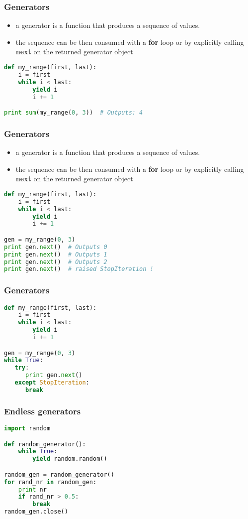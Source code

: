 \documentclass{beamer}
\begin{document}
\begin{frame}[fragile]
\frametitle{Generators}
\begin{itemize}
  \item a generator is a function that produces a sequence of values.
  \item the sequence can be then consumed with a {\bf for} loop or by explicitly
    calling {\bf next} on the returned generator object
\end{itemize}
\vspace{5 mm}
\begin{lstlisting}[language=python]
def my_range(first, last):
    i = first
    while i < last:
        yield i
        i += 1

print sum(my_range(0, 3))  # Outputs: 4
\end{lstlisting}
\end{frame}

\begin{frame}[fragile]
\frametitle{Generators}
\begin{itemize}
  \item a generator is a function that produces a sequence of values.
  \item the sequence can be then consumed with a {\bf for} loop or by explicitly
    calling {\bf next} on the returned generator object
\end{itemize}
\vspace{5 mm}
\begin{lstlisting}[language=python]
def my_range(first, last):
    i = first
    while i < last:
        yield i
        i += 1

gen = my_range(0, 3)
print gen.next()  # Outputs 0
print gen.next()  # Outputs 1
print gen.next()  # Outputs 2
print gen.next()  # raised StopIteration !
\end{lstlisting}
\end{frame}

\begin{frame}[fragile]
\frametitle{Generators}
\vspace{5 mm}
\begin{lstlisting}[language=python]
def my_range(first, last):
    i = first
    while i < last:
        yield i
        i += 1

gen = my_range(0, 3)
while True:
   try:
      print gen.next()
   except StopIteration:
      break
\end{lstlisting}
\end{frame}

\begin{frame}[fragile]
\frametitle{Endless generators}
\vspace{5 mm}
\begin{lstlisting}[language=python]
import random

def random_generator():
    while True:
        yield random.random()

random_gen = random_generator()
for rand_nr in random_gen:
    print nr
    if rand_nr > 0.5:
        break
random_gen.close()
\end{lstlisting}
\end{frame}
\end{document}
